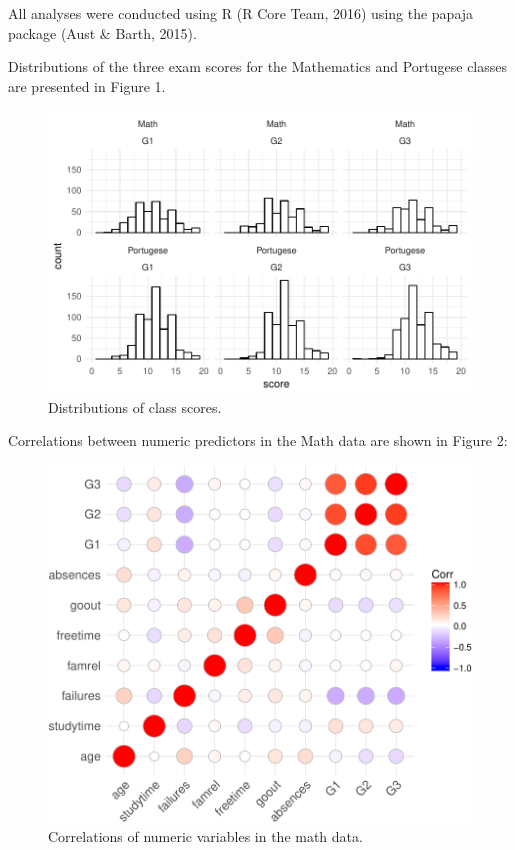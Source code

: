 \documentclass[english,floatsintext,man]{apa6}
\theoremstyle{definition}
\theoremstyle{definition}
\theoremstyle{definition}
\theoremstyle{remark}
\begin{document}
All analyses were conducted using R (R Core Team, 2016) using the papaja
package (Aust \& Barth, 2015).

Distributions of the three exam scores for the Mathematics and Portugese
classes are presented in Figure 1.

\begin{figure}

{\centering \includegraphics[width=1\linewidth]{studentAPA_comp_files/figure-latex/fig1-1} 

}

\caption{Distributions of class scores.}\label{fig:fig1}
\end{figure}

Correlations between numeric predictors in the Math data are shown in
Figure 2:

\begin{figure}

{\centering \includegraphics[width=0.7\linewidth]{studentAPA_comp_files/figure-latex/fig2-1} 

}

\caption{Correlations of numeric variables in the math data.}\label{fig:fig2}
\end{figure}
\end{document}
